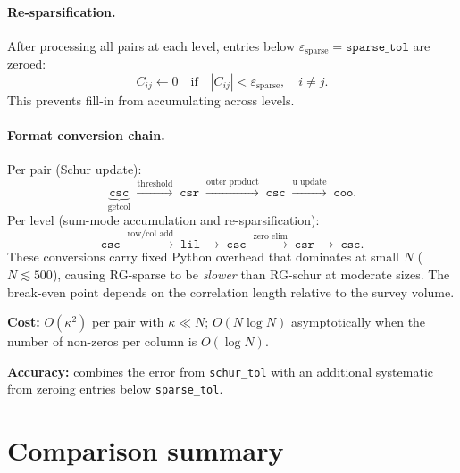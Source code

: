 \documentclass[11pt]{article}
\begin{document}
\paragraph{Re-sparsification.}
After processing all pairs at each level, entries below
$\varepsilon_\mathrm{sparse} = \texttt{sparse\_tol}$ are zeroed:
\begin{equation}
  C_{ij} \leftarrow 0
  \quad\text{if}\quad
  |C_{ij}| < \varepsilon_\mathrm{sparse},
  \quad i \neq j.
\end{equation}
This prevents fill-in from accumulating across levels.

\paragraph{Format conversion chain.}
Per pair (Schur update):
\begin{equation*}
  \underbrace{\texttt{csc}}_{\text{getcol}}
  \;\xrightarrow{\text{threshold}}\; \texttt{csr}
  \;\xrightarrow{\text{outer product}}\; \texttt{csc}
  \;\xrightarrow{\text{u update}}\; \texttt{coo}.
\end{equation*}
Per level (sum-mode accumulation and re-sparsification):
\begin{equation*}
  \texttt{csc}
  \;\xrightarrow{\text{row/col add}}\; \texttt{lil}
  \;\to\; \texttt{csc}
  \;\xrightarrow{\text{zero elim}}\; \texttt{csr}
  \;\to\; \texttt{csc}.
\end{equation*}
These conversions carry fixed Python overhead that dominates at small $N$
($N\lesssim 500$), causing RG-sparse to be \emph{slower} than RG-schur
at moderate sizes.
The break-even point depends on the correlation length relative to the
survey volume.

\noindent\textbf{Cost:} $O(\kappa^2)$ per pair with $\kappa \ll N$;
$O(N\log N)$ asymptotically when the number of non-zeros per column
is $O(\log N)$.

\noindent\textbf{Accuracy:} combines the error from \texttt{schur\_tol}
with an additional systematic from zeroing entries below
\texttt{sparse\_tol}.

\section{Comparison summary}
\end{document}
